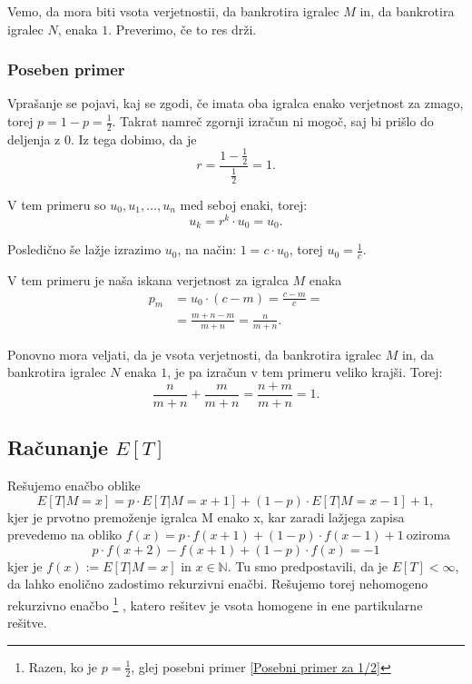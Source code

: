 \documentclass[12pt, a4paper]{article}
\begin{document}
Vemo, da mora biti vsota verjetnostii, da bankrotira igralec $M$ in, da bankrotira igralec $N$, enaka $1$. Preverimo, če to res drži.



\subsubsection{Poseben primer}
\label{Posebni primer za  r = 1}
Vprašanje se pojavi, kaj se zgodi, če imata oba igralca enako verjetnost za zmago, torej $p = 1 - p = \frac{1}{2}$. Takrat namreč zgornji izračun ni mogoč, saj bi prišlo do deljenja z $0$. Iz tega dobimo, da je 
$$r = \frac{1 - \frac{1}{2}}{\frac{1}{2}} = 1.$$

V tem primeru so $u_0, u_1, \dotso, u_n$ med seboj enaki, torej:
$$u_k = r^k \cdot u_0 = u_0.$$

Posledično še lažje izrazimo $u_0$, na način:
$1 = c\cdot u_0$, torej $u_0 = \frac{1}{c}.$

V tem primeru je naša iskana verjetnost za igralca $M$ enaka
\begin{equation*}
\begin{split}
p_m &= u_0 \cdot (c - m) = \frac{c-m}{c} = \\
		&= \frac{m + n - m}{m + n} = \frac{n}{m + n}.
\end{split} 
\end{equation*}

Ponovno mora veljati, da je vsota verjetnosti, da bankrotira igralec $M$ in, da bankrotira igralec $N$ enaka $1$, je pa izračun v tem primeru veliko krajši. Torej: 
$$\frac{n}{m + n} + \frac{m}{m + n} = \frac{n + m}{m+ n} = 1.$$



\subsection{Računanje $E[T]$}

Rešujemo enačbo oblike $$E[T|M=x] = p\cdot E[T|M=x+1] + (1-p)\cdot E[T|M=x-1] + 1,$$ kjer je prvotno premoženje igralca M enako x, kar zaradi lažjega zapisa prevedemo na obliko $f(x) = p\cdot f(x+1) + (1-p) \cdot f(x-1) + 1 ~ \textrm{oziroma} $ 
\begin{equation}
\label{prvotna rekurzivna}
p\cdot f(x+2) - f(x+1) + (1-p)\cdot f(x) = -1
\end{equation}
kjer je $f(x):=E[T|M=x]$ in $x \in \mathbb{N}$. Tu smo predpostavili, da je $E[T] < \infty$, da lahko enolično zadostimo rekurzivni enačbi. 
Rešujemo torej nehomogeno rekurzivno enačbo \footnote{Razen, ko je $p=\frac{1}{2}$, glej posebni primer \ref{Posebni primer za 1/2} } , katero rešitev je vsota homogene in ene partikularne rešitve. \\
\end{document}
